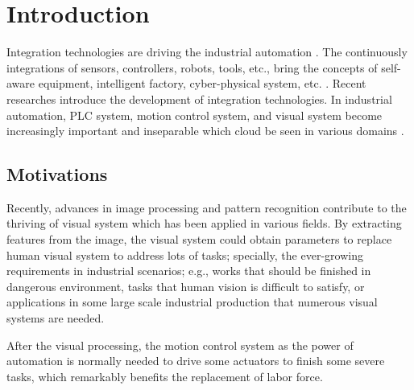 \documentclass[journal,UTF8]{IEEEtran}
\begin{document}
%
\IEEEpeerreviewmaketitle



\section{Introduction}
Integration technologies are driving the industrial automation \cite{Kazmierkowski2007Integration}. The continuously integrations of sensors, controllers, robots, tools, etc., bring the concepts of self-aware equipment, intelligent factory, cyber-physical system, etc. \cite{Wan2018An,Chekired2018Industrial}. Recent researches \cite{Colombo2006An,Vaccaro2010An,Dean2017Integration} introduce the development of integration technologies. In industrial automation, PLC system,  motion control system, and visual system become increasingly important and inseparable which cloud be seen in various domains \cite{Chang2006Motion,Feng2005Practical}. %

\subsection{Motivations}
Recently, advances in image processing and pattern recognition contribute to the thriving of visual system which has been applied in various fields. By extracting features from the image, the visual system could obtain parameters to replace human visual system to address lots of tasks; specially, the ever-growing requirements in industrial scenarios; e.g., works that should be finished in dangerous environment, tasks that human vision is difficult to satisfy, or applications in some large scale industrial production that numerous visual systems are needed. 

After the visual processing, the motion control system as the power of automation is normally needed to drive some actuators to finish some severe tasks, which remarkably benefits the replacement of labor force. 
\end{document}
